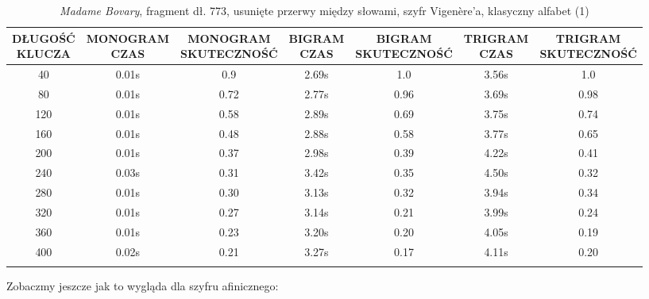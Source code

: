 \documentclass[a4paper]{article}
\theoremstyle{defn}
\theoremstyle{theorem}
\theoremstyle{lemma}
\theoremstyle{cor}
\theoremstyle{fact}
\begin{document}
\begin{center}\begin{small}\begin{longtable}{|c|c|c|c|c|c|c|} 
\hline \makecell{DŁUGOŚĆ\\KLUCZA} &  \makecell{MONOGRAM\\CZAS} & \makecell{MONOGRAM\\SKUTECZNOŚĆ} & \makecell{BIGRAM\\CZAS} &  \makecell{BIGRAM\\SKUTECZNOŚĆ} & \makecell{TRIGRAM\\CZAS} & \makecell{TRIGRAM\\SKUTECZNOŚĆ}\\ \hline 
40 & 0.01s & 0.9 & 2.69s & 1.0 & 3.56s & 1.0 \\ \hline 
80 & 0.01s & 0.72 & 2.77s & 0.96 & 3.69s & 0.98 \\ \hline 
120 & 0.01s & 0.58 & 2.89s & 0.69 & 3.75s & 0.74 \\ \hline 
160 & 0.01s & 0.48 & 2.88s & 0.58 & 3.77s & 0.65 \\ \hline 
200 & 0.01s & 0.37 & 2.98s & 0.39 & 4.22s & 0.41 \\ \hline 
240 & 0.03s & 0.31 & 3.42s & 0.35 & 4.50s & 0.32 \\ \hline 
280 & 0.01s & 0.30 & 3.13s & 0.32 & 3.94s & 0.34 \\ \hline 
320 & 0.01s & 0.27 & 3.14s & 0.21 & 3.99s & 0.24 \\ \hline 
360 & 0.01s & 0.23 & 3.20s & 0.20 & 4.05s & 0.19 \\ \hline 
400 & 0.02s & 0.21 & 3.27s & 0.17 & 4.11s & 0.20 \\ \hline 
\caption{\textit{Madame Bovary}, fragment dł. 773, usunięte przerwy między słowami, szyfr Vigenère'a, klasyczny alfabet (1)}
\end{longtable}\end{small}\end{center} 
Zobaczmy jeszcze jak to wygląda dla szyfru afinicznego:
\end{document}
